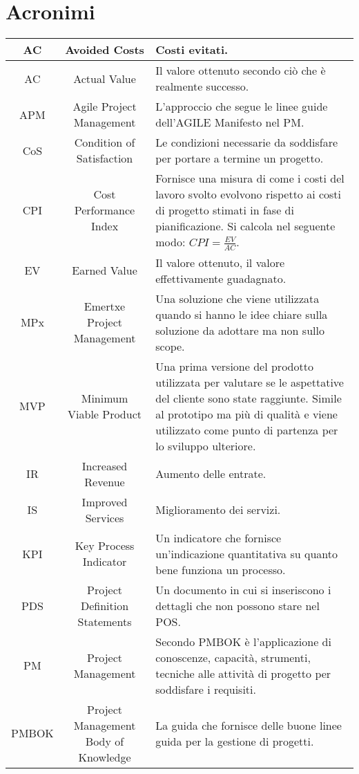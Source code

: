 \section{Acronimi}

\begin{tabularx}{\textwidth}{|c|c|X|}
	\hline
	AC & Avoided Costs & Costi evitati.\\
	\hline
	AC & Actual Value & Il valore ottenuto secondo ciò che è realmente successo.\\
	\hline
	APM & Agile Project Management & L'approccio che segue le linee guide dell'AGILE Manifesto nel PM.\\
	\hline
	CoS & Condition of Satisfaction & Le condizioni necessarie da soddisfare per portare a termine un progetto.\\
	\hline
	CPI & Cost Performance Index & Fornisce una misura di come i costi del lavoro svolto evolvono rispetto ai costi di progetto stimati in fase di pianificazione. Si calcola nel seguente modo: $CPI = \frac{EV}{AC}$.\\
	\hline
	EV & Earned Value & Il valore ottenuto, il valore effettivamente guadagnato.\\
	\hline
	MPx & Emertxe Project Management &
	Una soluzione che viene utilizzata quando si hanno le idee chiare sulla soluzione da adottare ma non sullo scope.\\
	\hline
	MVP & Minimum Viable Product & Una prima versione del prodotto utilizzata per valutare se le aspettative del cliente sono state raggiunte. Simile al prototipo ma più di qualità e viene utilizzato come punto di partenza per lo sviluppo ulteriore.\\
	\hline
	IR & Increased Revenue & Aumento delle entrate.\\
	\hline
	IS & Improved Services & Miglioramento dei servizi.\\
	\hline
	KPI & Key Process Indicator & Un indicatore che fornisce un'indicazione quantitativa su quanto bene funziona un processo.\\
	\hline
	PDS & Project Definition Statements & Un documento in cui si inseriscono i dettagli che non possono stare nel POS.\\
	\hline
	PM & Project Management & Secondo PMBOK è l'applicazione di conoscenze, capacità, strumenti, tecniche alle attività di progetto per soddisfare i requisiti.\\
	\hline
	PMBOK & Project Management Body of Knowledge & La guida che fornisce delle buone linee guida per la gestione di progetti.\\

\end{tabularx}
